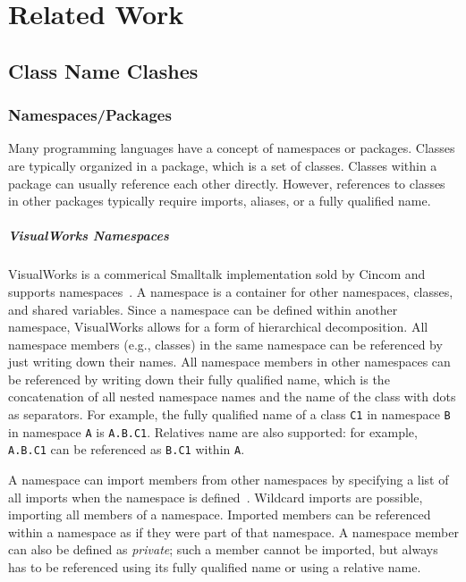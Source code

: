 \chapter{Related Work}

\section{Class Name Clashes}

\subsection{Namespaces/Packages}
Many programming languages have a concept of namespaces or packages. Classes are typically organized in a package, which is a set of classes. Classes within a package can usually reference each other directly. However, references to classes in other packages typically require imports, aliases, or a fully qualified name.

\paragraph{VisualWorks Namespaces}
VisualWorks is a commerical Smalltalk implementation sold by Cincom and supports namespaces~\cite{brauer2015programming}. A namespace is a container for other namespaces, classes, and shared variables. Since a namespace can be defined within another namespace, VisualWorks allows for a form of hierarchical decomposition. All namespace members (e.g., classes) in the same namespace can be referenced by just writing down their names. All namespace members in other namespaces can be referenced by writing down their fully qualified name, which is the concatenation of all nested namespace names and the name of the class with dots as separators. For example, the fully qualified name of a class \texttt{C1} in namespace \texttt{B} in namespace \texttt{A} is \texttt{A.B.C1}. Relatives name are also supported: for example, \texttt{A.B.C1} can be referenced as \texttt{B.C1} within \texttt{A}.

A namespace can import members from other namespaces by specifying a list of all imports when the namespace is defined~\cite{cincomst}. Wildcard imports are possible, importing all members of a namespace. Imported members can be referenced within a namespace as if they were part of that namespace. A namespace member can also be defined as \emph{private}; such a member cannot be imported, but always has to be referenced using its fully qualified name or using a relative name.

